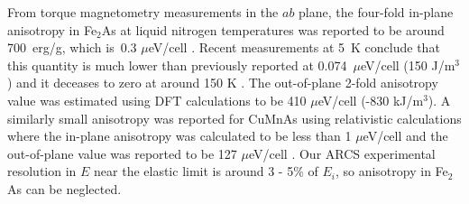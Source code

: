 \documentclass[letterpaper,10pt,doublespacing,edeposit]{uiucthesis2020}
\begin{document}
\begin{mainmatter}
From torque magnetometry measurements in the $ab$ plane, the four-fold in-plane anisotropy in Fe$_2$As at liquid nitrogen temperatures was reported to be around 700~erg/g, which is~0.3 $\mu$eV/cell \cite{Achiwa1967}.
Recent measurements at 5~K conclude that this quantity is much lower than previously reported at 0.074~$\mu$eV/cell (150 J/m$^3$) and it deceases to zero at around 150 K \cite{Yang2020}.
The out-of-plane 2-fold anisotropy value was estimated using DFT calculations to be 410 $\mu$eV/cell (-830 kJ/m$^3$).\cite{Yang2020} A similarly small anisotropy was reported for CuMnAs using relativistic calculations where the in-plane anisotropy was calculated to be less than 1 $\mu$eV/cell and the out-of-plane value was reported to be 127 $\mu$eV/cell \cite{Wadley2015}. Our ARCS experimental resolution in $E$ near the elastic limit is around  3 - 5\% of $E_i$, so anisotropy in Fe$_2$As can be neglected. 



\end{mainmatter}
\end{document}
